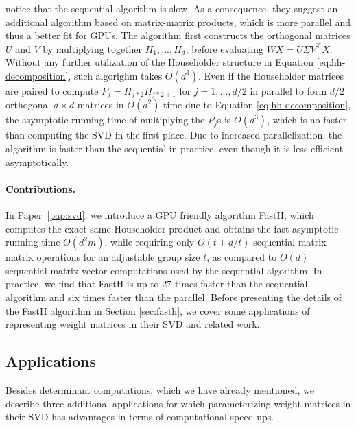 \documentclass[11pt,a4paper,twoside,openright,final]{memoir}
\newcommand*{\paperref}[1]{Paper~\hyperref[#1]{\ref{#1}}}
\begin{document}
\citet{sequential} notice that the sequential algorithm is slow. 
As a consequence, they suggest an additional algorithm based on matrix-matrix products, which is more parallel and thus a better fit for GPUs. 
The algorithm first constructs the orthogonal matrices $U$ and $V$ by multiplying together $H_1, ..., H_d$, before evaluating $WX = U\Sigma V^\intercal X$.
Without any further utilization of the Householder structure in Equation \eqref{eq:hh-decomposition}, such algorighm takes $O(d^3)$.
Even if the Householder matrices are paired to compute $P_j = H_{j*2}H_{j*2+1}$ for $j=1, ..., d/2$ in parallel to form $d/2$ orthogonal $d\times d$ matrices in $O(d^2)$ time due to Equation \eqref{eq:hh-decomposition}, the asymptotic running time of multiplying the $P_j$s is $O(d^3)$, which is no faster than computing the SVD in the first place.
Due to increased parallelization, the algorithm is faster than the sequential in practice, even though it is less efficient asymptotically.

\paragraph{Contributions.} In \paperref{pap:svd}, we introduce a GPU friendly algorithm FastH, which computes the exact same Householder product and obtains the fast asymptotic running time $O(d^2m)$, while requiring only $O(t + d/t)$ sequential matrix-matrix operations for an adjustable group size $t$, as compared to $O(d)$ sequential matrix-vector computations used by the sequential algorithm.
In practice, we find that FastH is up to 27 times faster than the sequential algorithm and six times faster than the parallel. 
Before presenting the details of the FastH algorithm in Section \ref{sec:fasth}, we cover some applications of representing weight matrices in their SVD and related work.

\subsection{Applications}\label{sec:fasth-applications}
Besides determinant computations, which we have already mentioned, we describe three additional applications for which parameterizing weight matrices in their SVD has advantages in terms of computational speed-ups.
\end{document}

